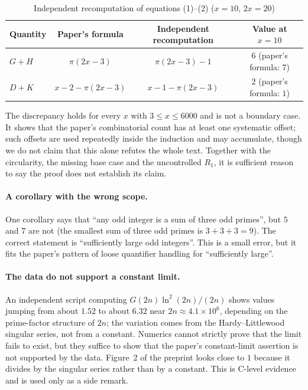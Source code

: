 \documentclass[11pt,a4paper]{article}
\theoremstyle{plain}
\theoremstyle{definition}
\begin{document}
\begin{table}[htbp]
\centering
\small
\caption{Independent recomputation of equations (1)--(2) ($x=10$, $2x=20$)}
\label{tab:numerical}
\begin{tabular}{@{}lccc@{}}
\toprule
Quantity & Paper's formula & Independent recomputation & Value at $x=10$\\
\midrule
$G+H$ & $\pi(2x-3)$ & $\pi(2x-3)-1$ & $6$ (paper's formula: $7$)\\
$D+K$ & $x-2-\pi(2x-3)$ & $x-1-\pi(2x-3)$ & $2$ (paper's formula: $1$)\\
\bottomrule
\end{tabular}
\end{table}

The discrepancy holds for every $x$ with $3\le x\le6000$ and is not a boundary case. It shows that the paper's combinatorial count has at least one systematic offset; such offsets are used repeatedly inside the induction and may accumulate, though we do not claim that this alone refutes the whole text. Together with the circularity, the missing base case and the uncontrolled $R_1$, it is sufficient reason to say the proof does not establish its claim.

\paragraph{A corollary with the wrong scope.}
One corollary says that ``any odd integer is a sum of three odd primes'', but $5$ and $7$ are not (the smallest sum of three odd primes is $3+3+3=9$). The correct statement is ``sufficiently large odd integers''. This is a small error, but it fits the paper's pattern of loose quantifier handling for ``sufficiently large''.

\paragraph{The data do not support a constant limit.}
An independent script computing $G(2n)\ln^2(2n)/(2n)$ shows values jumping from about $1.52$ to about $6.32$ near $2n\approx4.1\times10^6$, depending on the prime-factor structure of $2n$; the variation comes from the Hardy--Littlewood singular series, not from a constant. Numerics cannot strictly prove that the limit fails to exist, but they suffice to show that the paper's constant-limit assertion is not supported by the data. Figure~2 of the preprint looks close to $1$ because it divides by the singular series rather than by a constant. This is C-level evidence and is used only as a side remark.
\end{document}
